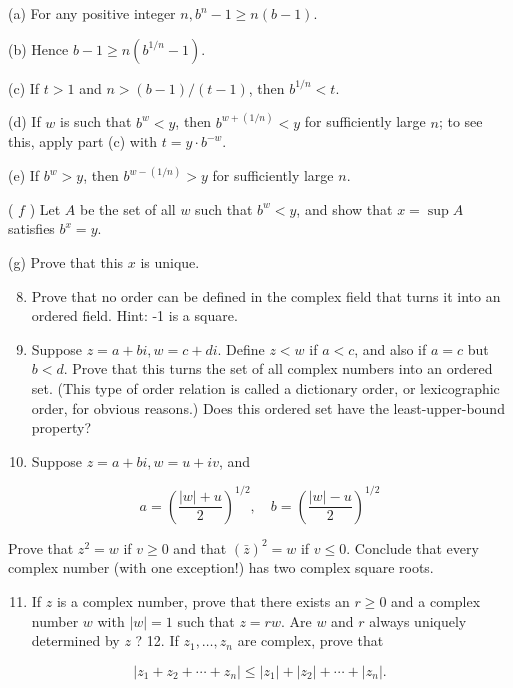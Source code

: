 \documentclass[10pt]{article}
\begin{document}
(a) For any positive integer $n, b^{n}-1 \geq n(b-1)$.

(b) Hence $b-1 \geq n\left(b^{1 / n}-1\right)$.

(c) If $t>1$ and $n>(b-1) /(t-1)$, then $b^{1 / n}<t$.

(d) If $w$ is such that $b^{w}<y$, then $b^{w+(1 / n)}<y$ for sufficiently large $n$; to see this, apply part (c) with $t=y \cdot b^{-w}$.

(e) If $b^{w}>y$, then $b^{w-(1 / n)}>y$ for sufficiently large $n$.

( $f$ ) Let $A$ be the set of all $w$ such that $b^{w}<y$, and show that $x=\sup A$ satisfies $b^{x}=y$.

(g) Prove that this $x$ is unique.

\begin{enumerate}
  \setcounter{enumi}{7}
  \item Prove that no order can be defined in the complex field that turns it into an ordered field. Hint: -1 is a square.

  \item Suppose $z=a+b i, w=c+d i$. Define $z<w$ if $a<c$, and also if $a=c$ but $b<d$. Prove that this turns the set of all complex numbers into an ordered set. (This type of order relation is called a dictionary order, or lexicographic order, for obvious reasons.) Does this ordered set have the least-upper-bound property?

  \item Suppose $z=a+b i, w=u+i v$, and

\end{enumerate}

$$
a=\left(\frac{|w|+u}{2}\right)^{1 / 2}, \quad b=\left(\frac{|w|-u}{2}\right)^{1 / 2}
$$

Prove that $z^{2}=w$ if $v \geq 0$ and that $(\bar{z})^{2}=w$ if $v \leq 0$. Conclude that every complex number (with one exception!) has two complex square roots.

\begin{enumerate}
  \setcounter{enumi}{10}
  \item If $z$ is a complex number, prove that there exists an $r \geq 0$ and a complex number $w$ with $|w|=1$ such that $z=r w$. Are $w$ and $r$ always uniquely determined by $z$ ? 12. If $z_{1}, \ldots, z_{n}$ are complex, prove that
\end{enumerate}

$$
\left|z_{1}+z_{2}+\cdots+z_{n}\right| \leq\left|z_{1}\right|+\left|z_{2}\right|+\cdots+\left|z_{n}\right| .
$$
\end{document}
